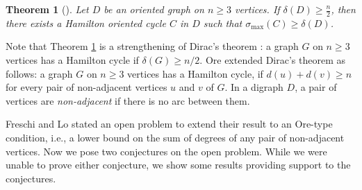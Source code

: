 \documentclass[11pt]{article}
\newtheorem{theorem}{Theorem}[section]
\newcommand{\GGr}[1]{{#1}}
\newcommand{\2}{\vspace{0.2cm}}
\begin{document}



\begin{theorem}[\cite{FL24}]\label{Dirac-type theorem}
Let $D$ be an oriented graph on $n\ge 3$ vertices. If $\delta(D) \ge \frac{n}{2}$, then there exists a Hamilton oriented cycle $C$ in $D$ such that $\sigma_{\max}(C)\ge \delta(D)$.
\end{theorem}
Note that Theorem  \ref{Dirac-type theorem}  is a strengthening of Dirac's theorem \cite{D52}: a graph $G$ on $n\ge 3$ vertices has a Hamilton cycle if $\delta(G)\ge n/2.$ Ore \cite{O60} extended Dirac's theorem as follows: a graph $G$ on $n\ge 3$ vertices has a Hamilton cycle, if $d(u)+d(v)\ge n$ for every pair of non-adjacent vertices $u$ and $v$  of $G$. In a digraph $D$, a pair of vertices are {\em non-adjacent} if there is no arc between them.







Freschi and Lo \cite{FL24} stated an open problem to extend their result to an Ore-type condition, \GGr{i.e.,  a lower bound on the sum of degrees of any pair of non-adjacent vertices.}
Now we pose two conjectures on the open problem. While we were unable to prove either conjecture, we show some results providing support to the conjectures.
\end{document}
